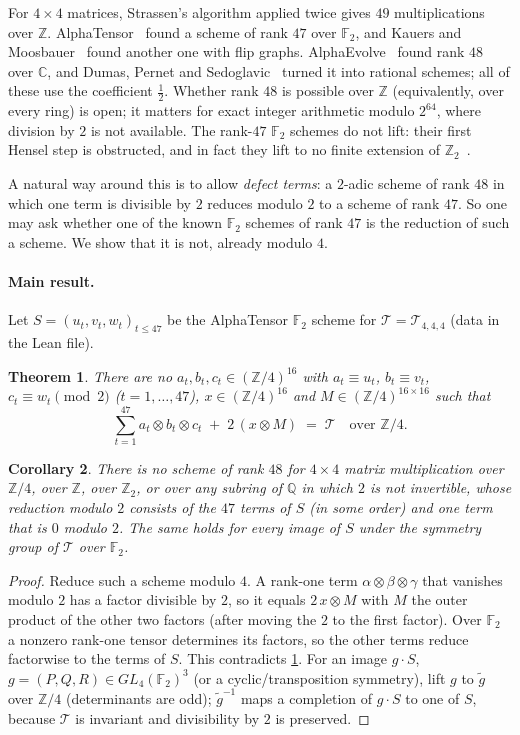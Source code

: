 \documentclass[11pt]{article}
\numberwithin{equation}{section}
\newtheorem{theorem}{Theorem}[section]
\newtheorem{corollary}[theorem]{Corollary}
\theoremstyle{definition}
\theoremstyle{remark}
\newcommand{\F}{\mathbb F}
\newcommand{\Z}{\mathbb Z}
\newcommand{\Q}{\mathbb Q}
\newcommand{\C}{\mathbb C}
\newcommand{\T}{\mathcal T}
\begin{document}
For $4\times4$ matrices, Strassen's algorithm applied twice gives $49$ multiplications over $\Z$.
AlphaTensor~\cite{alphatensor} found a scheme of rank $47$ over $\F_2$, and Kauers and Moosbauer~\cite{kmflip}
found another one with flip graphs. AlphaEvolve~\cite{alphaevolve} found rank $48$ over $\C$, and Dumas,
Pernet and Sedoglavic~\cite{dps48,dps48b,dps48c} turned it into rational schemes; all of these use the
coefficient $\tfrac12$. Whether rank $48$ is possible over $\Z$ (equivalently, over every ring) is open;
it matters for exact integer arithmetic modulo $2^{64}$, where division by $2$ is not available.
The rank-$47$ $\F_2$ schemes do not lift: their first Hensel step is obstructed, and in fact they lift to no
finite extension of $\Z_2$~\cite{cloudroom}.

A natural way around this is to allow \emph{defect terms}: a $2$-adic scheme of rank $48$ in which one term
is divisible by $2$ reduces modulo $2$ to a scheme of rank $47$. So one may ask whether one of the known
$\F_2$ schemes of rank $47$ is the reduction of such a scheme. We show that it is not, already modulo $4$.

\paragraph{Main result.} Let $S=(u_t,v_t,w_t)_{t\le 47}$ be the AlphaTensor $\F_2$ scheme for
$\T=\T_{4,4,4}$ (data in the Lean file).

\begin{theorem}\label{thm:main}
There are no $a_t,b_t,c_t\in(\Z/4)^{16}$ with $a_t\equiv u_t$, $b_t\equiv v_t$, $c_t\equiv w_t\pmod 2$
($t=1,\dots,47$), $x\in(\Z/4)^{16}$ and $M\in(\Z/4)^{16\times16}$ such that
\[ \sum_{t=1}^{47} a_t\otimes b_t\otimes c_t \;+\; 2\,(x\otimes M) \;=\; \T \quad\text{over } \Z/4. \]
\end{theorem}

\begin{corollary}\label{cor}
There is no scheme of rank $48$ for $4\times4$ matrix multiplication over $\Z/4$, over $\Z$, over $\Z_2$,
or over any subring of $\Q$ in which $2$ is not invertible, whose reduction modulo $2$ consists of the $47$
terms of $S$ (in some order) and one term that is $0$ modulo $2$. The same holds for every image of $S$
under the symmetry group of $\T$ over $\F_2$.
\end{corollary}
\begin{proof}
Reduce such a scheme modulo $4$. A rank-one term $\alpha\otimes\beta\otimes\gamma$ that vanishes modulo $2$
has a factor divisible by $2$, so it equals $2\,x\otimes M$ with $M$ the outer product of the other two
factors (after moving the $2$ to the first factor). Over $\F_2$ a nonzero rank-one tensor determines its
factors, so the other terms reduce factorwise to the terms of $S$. This contradicts \cref{thm:main}.
For an image $g\cdot S$, $g=(P,Q,R)\in GL_4(\F_2)^3$ (or a cyclic/transposition symmetry), lift $g$ to
$\tilde g$ over $\Z/4$ (determinants are odd); $\tilde g^{-1}$ maps a completion of $g\cdot S$ to one of $S$,
because $\T$ is invariant and divisibility by $2$ is preserved.
\end{proof}
\end{document}
